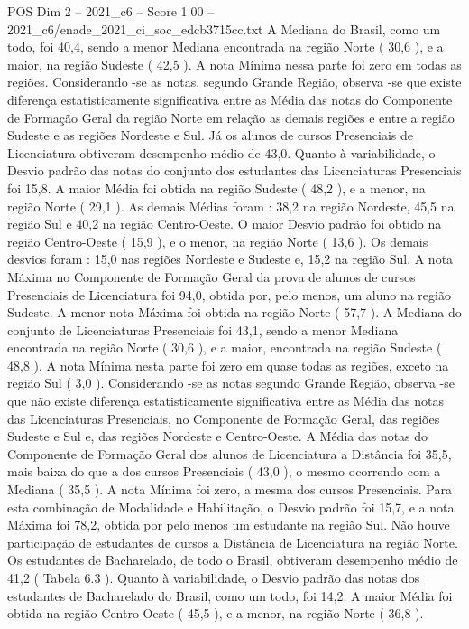 \begin{textsample}{POS Dim 2 – 2021\_c6 – Score 1.00 – 2021\_c6/enade\_2021\_ci\_soc\_edcb3715cc.txt}
A Mediana do Brasil, como um todo, foi 40,4, sendo a menor Mediana encontrada na região Norte ( 30,6 ), e a maior, na região Sudeste ( 42,5 ).
A nota Mínima nessa parte foi zero em todas as regiões.
Considerando -se as notas, segundo Grande Região, observa -se que existe diferença estatisticamente significativa entre as Média das notas do Componente de Formação Geral da região Norte em relação as demais regiões e entre a região Sudeste e as regiões Nordeste e Sul.
Já os alunos de cursos Presenciais de Licenciatura obtiveram desempenho médio de 43,0.
Quanto à variabilidade, o Desvio padrão das notas do conjunto dos estudantes das Licenciaturas Presenciais foi 15,8.
A maior Média foi obtida na região Sudeste ( 48,2 ), e a menor, na região Norte ( 29,1 ).
As demais Médias foram : 38,2 na região Nordeste, 45,5 na região Sul e 40,2 na região Centro-Oeste.
O maior Desvio padrão foi obtido na região Centro-Oeste ( 15,9 ), e o menor, na região Norte ( 13,6 ).
Os demais desvios foram : 15,0 nas regiões Nordeste e Sudeste e, 15,2 na região Sul.
A nota Máxima no Componente de Formação Geral da prova de alunos de cursos Presenciais de Licenciatura foi 94,0, obtida por, pelo menos, um aluno na região Sudeste.
A menor nota Máxima foi obtida na região Norte ( 57,7 ).
A Mediana do conjunto de Licenciaturas Presenciais foi 43,1, sendo a menor Mediana encontrada na região Norte ( 30,6 ), e a maior, encontrada na região Sudeste ( 48,8 ).
A nota Mínima nesta parte foi zero em quase todas as regiões, exceto na região Sul ( 3,0 ).
Considerando -se as notas segundo Grande Região, observa -se que não existe diferença estatisticamente significativa entre as Média das notas das Licenciaturas Presenciais, no Componente de Formação Geral, das regiões Sudeste e Sul e, das regiões Nordeste e Centro-Oeste.
A Média das notas do Componente de Formação Geral dos alunos de Licenciatura a Distância foi 35,5, mais baixa do que a dos cursos Presenciais ( 43,0 ), o mesmo ocorrendo com a Mediana ( 35,5 ).
A nota Mínima foi zero, a mesma dos cursos Presenciais.
Para esta combinação de Modalidade e Habilitação, o Desvio padrão foi 15,7, e a nota Máxima foi 78,2, obtida por pelo menos um estudante na região Sul.
Não houve participação de estudantes de cursos a Distância de Licenciatura na região Norte.
Os estudantes de Bacharelado, de todo o Brasil, obtiveram desempenho médio de 41,2 ( Tabela 6.3 ).
Quanto à variabilidade, o Desvio padrão das notas dos estudantes de Bacharelado do Brasil, como um todo, foi 14,2.
A maior Média foi obtida na região Centro-Oeste ( 45,5 ), e a menor, na região Norte ( 36,8 ).

\end{textsample}

